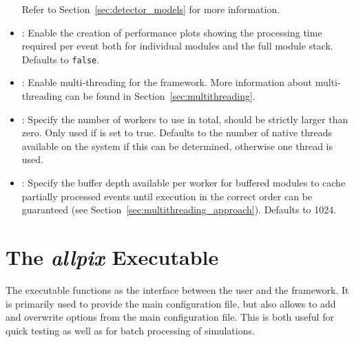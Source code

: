 \begin{itemize}
Refer to Section~\ref{sec:detector_models} for more information.
\item {}: Enable the creation of performance plots showing the processing time required per event both for individual modules and the full module stack. Defaults to \texttt{false}.
\item {}: Enable multi-threading for the framework. More information about multi-threading can be found in Section~\ref{sec:multithreading}.
\item {}: Specify the number of workers to use in total, should be strictly larger than zero. Only used if  is set to true. Defaults to the number of native threads available on the system if this can be determined, otherwise one thread is used.
\item {}: Specify the buffer depth available per worker for buffered modules to cache partially processed events until execution in the correct order can be guaranteed (see Section~\ref{sec:multithreading_approach}). Defaults to 1024.
\end{itemize}

\section{The \textit{allpix} Executable}
\label{sec:allpix_executable}
The  executable functions as the interface between the user and the framework. It is primarily used to provide the main configuration file, but also allows to add and overwrite options from the main configuration file. This is both useful for quick testing as well as for batch processing of simulations.

